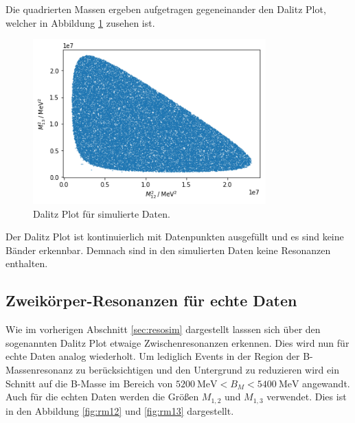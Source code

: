 Die quadrierten Massen ergeben aufgetragen gegeneinander den Dalitz Plot, welcher in Abbildung \ref{fig:dalitzSim} zusehen ist.

\begin{figure}[htb]
  \centering
  \includegraphics[width=0.8\textwidth]{plots/sim_dalitz_plot_m12_m13.png}
  \caption{Dalitz Plot f\"ur simulierte Daten.}
  \label{fig:dalitzSim}
\end{figure}

Der Dalitz Plot ist kontinuierlich mit Datenpunkten ausgef\"ullt und es sind keine B\"ander erkennbar. Demnach sind in den simulierten Daten keine Resonanzen enthalten.

\subsection{Zweikörper-Resonanzen für echte Daten}

Wie im vorherigen Abschnitt \ref{sec:resosim} dargestellt lasssen sich über den sogenannten Dalitz Plot etwaige Zwischenresonanzen erkennen.
Dies wird nun für echte Daten analog wiederholt.
Um lediglich Events in der Region der B-Massenresonanz zu berücksichtigen und den Untergrund zu reduzieren wird ein Schnitt auf die B-Masse im Bereich von $\SI{5200}{\mega\electronvolt} < B_M < \SI{5400}{\mega\electronvolt}$ angewandt.
Auch für die echten Daten werden die Größen $M_{1,2}$ und $M_{1,3}$ verwendet.
Dies ist in den Abbildung \ref{fig:rm12} und \ref{fig:rm13} dargestellt.

